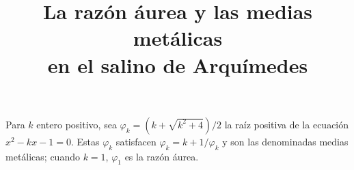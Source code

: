 \documentclass[autocontact]{gaceta}
\title{La razón áurea y las medias metálicas\\en el salino de Arquímedes}
\begin{document}

\previousvspace{-1.8cm}
\makesupertitle
\previousvspace{-0.25cm}
\maketitle
\vspace*{-0.4cm}
\thispagestyle{empty} %


Para $k$ entero positivo, sea $\varphi_k = ({k+\sqrt{k^2+4}})/{2}$ 
la raíz positiva de la ecuación $x^2-kx-1 = 0$.
Estas $\varphi_k$ satisfacen 
$\varphi_k = k+1/\varphi_k$ %
y son las denominadas medias metálicas; 
cuando $k=1$, $\varphi_1$ es la razón áurea.

\end{document}
